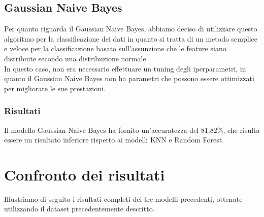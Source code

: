 \documentclass[../../Report.tex]{subfiles}
\begin{document}
\subsection{Gaussian Naive Bayes}
Per quanto riguarda il Gaussian Naive Bayes, abbiamo deciso di utilizzare questo algoritmo per la classificazione dei dati in quanto si tratta di un metodo semplice e veloce per la classificazione basato sull'assunzione che le feature siano distribuite secondo una distribuzione normale.\\
In questo caso, non era necessario effettuare un tuning degli iperparametri, in quanto il Gaussian Naive Bayes non ha parametri che possono essere ottimizzati per migliorare le sue prestazioni.

\subsubsection{Risultati}
Il modello Gaussian Naive Bayes ha fornito un'accuratezza del 81.82\%, che risulta essere un risultato inferiore rispetto ai modelli KNN e Random Forest.

\section{Confronto dei risultati}
Illustriamo di seguito i risultati completi dei tre modelli precedenti, ottenute utilizzando il dataset precedentemente descritto.
\end{document}
